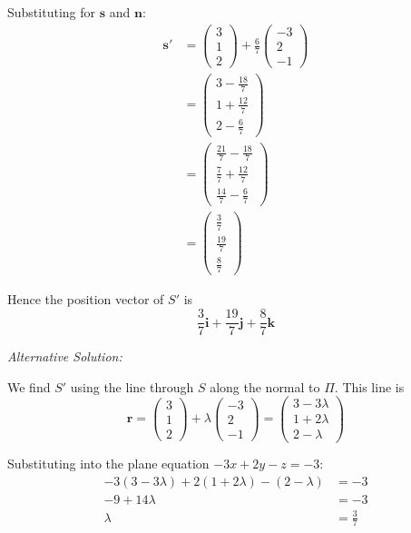 \documentclass[leqno]{article}
\begin{document}
\begin{enumerate}[
  label=\textbf{\arabic*.},
  leftmargin=*,
  topsep=0pt,
  partopsep=0pt,
  parsep=0pt
]
\begin{djsSolution}
\begin{enumerate}[label=\textbf{(\alph*)}]
Substituting for \(\mathbf s\) and \(\mathbf n\):
\begin{align*}
\mathbf s'
&=\begin{pmatrix}3\\1\\2\end{pmatrix}+\frac67\begin{pmatrix}-3\\2\\-1\end{pmatrix} \\
&=\begin{pmatrix}3-\frac{18}{7}\\[2pt]1+\frac{12}{7}\\[2pt]2-\frac67\end{pmatrix} \\
&=\begin{pmatrix}\frac{21}{7}-\frac{18}{7}\\[2pt]\frac{7}{7}+\frac{12}{7}\\[2pt]\frac{14}{7}-\frac67\end{pmatrix} \\
&=\begin{pmatrix}\frac37\\[2pt]\frac{19}{7}\\[2pt]\frac87\end{pmatrix}
\end{align*}

Hence the position vector of \(S'\) is
\[
\frac37\mathbf i+\frac{19}{7}\mathbf j+\frac87\mathbf k
\]

{\setlength{\parskip}{8pt}%
\textit{Alternative Solution:}

We find \(S'\) using the line through \(S\) along the normal to \(\Pi\). This line is
\[
\mathbf r=\begin{pmatrix}3\\1\\2\end{pmatrix}+\lambda\begin{pmatrix}-3\\2\\-1\end{pmatrix}=\begin{pmatrix}3-3\lambda\\1+2\lambda\\2-\lambda\end{pmatrix}
\]

Substituting into the plane equation \(-3x+2y-z=-3\):
\begin{align*}
-3(3-3\lambda)+2(1+2\lambda)-(2-\lambda)&=-3 \\
-9+14\lambda&=-3 \\
\lambda&=\frac37
\end{align*}

}
\end{enumerate}
\end{djsSolution}
\end{enumerate}
\end{document}

